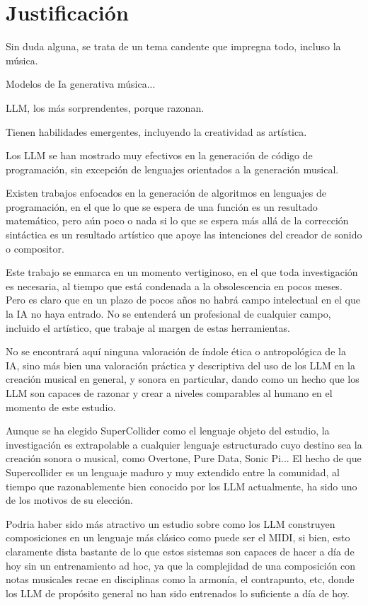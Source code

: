 \chapter{Justificación}

Sin duda alguna, se trata de un tema candente que impregna todo, incluso la música.

Modelos de Ia generativa música...

LLM, los más sorprendentes, porque razonan.

Tienen habilidades emergentes, incluyendo la creatividad as artística.

Los LLM se han mostrado muy efectivos en la generación de código de programación, sin excepción de lenguajes orientados a la generación musical. 

Existen trabajos enfocados en la generación de algoritmos en lenguajes de programación, en el que lo que se espera de una función es un resultado matemático, pero aún poco o nada si lo que se espera más allá de la corrección sintáctica es un resultado artístico que apoye las intenciones del creador de sonido o compositor.

Este trabajo se enmarca en un momento vertiginoso, en el que toda investigación es necesaria, al tiempo que está condenada a la obsolescencia en pocos meses. Pero es claro que en un plazo de pocos años no habrá campo intelectual en el que la IA no haya entrado. No se entenderá un profesional de cualquier campo, incluido el artístico, que trabaje al margen de estas herramientas.

No se encontrará aquí ninguna valoración de índole ética o antropológica de la IA, sino más bien una valoración práctica y descriptiva del uso de los LLM en la creación musical en general, y sonora en particular, dando como un hecho que los LLM son capaces de razonar y crear a niveles comparables al humano en el momento de este estudio.

Aunque se ha elegido SuperCollider como el lenguaje objeto del estudio, la investigación es extrapolable a cualquier lenguaje estructurado cuyo destino sea la creación sonora o musical, como Overtone, Pure Data, Sonic Pi... El hecho de que Supercollider es un lenguaje maduro y muy extendido entre la comunidad, al tiempo que razonablemente bien conocido por los LLM actualmente, ha sido uno de los motivos de su elección.

Podria haber sido más atractivo un estudio sobre como los LLM construyen composiciones en un lenguaje más clásico como puede ser el MIDI, si bien, esto claramente dista bastante de lo que estos sistemas son capaces de hacer a día de hoy sin un entrenamiento ad hoc, ya que la complejidad de una composición con notas musicales recae en disciplinas como la armonía, el contrapunto, etc, donde los LLM de propósito general no han sido entrenados lo suficiente a día de hoy.
